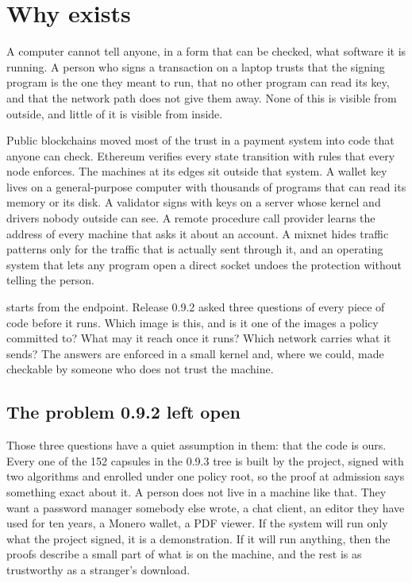 \section{Why \nonos{} exists}\label{sec:why}

A computer cannot tell anyone, in a form that can be checked, what software it is running. A person who signs a transaction on a laptop trusts that the signing program is the one they meant to run, that no other program can read its key, and that the network path does not give them away. None of this is visible from outside, and little of it is visible from inside.

Public blockchains moved most of the trust in a payment system into code that anyone can check. Ethereum verifies every state transition with rules that every node enforces. The machines at its edges sit outside that system. A wallet key lives on a general-purpose computer with thousands of programs that can read its memory or its disk. A validator signs with keys on a server whose kernel and drivers nobody outside can see. A remote procedure call provider learns the address of every machine that asks it about an account. A mixnet hides traffic patterns only for the traffic that is actually sent through it, and an operating system that lets any program open a direct socket undoes the protection without telling the person.

\nonos{} starts from the endpoint. Release 0.9.2 asked three questions of every piece of code before it runs. Which image is this, and is it one of the images a policy committed to? What may it reach once it runs? Which network carries what it sends? The answers are enforced in a small kernel and, where we could, made checkable by someone who does not trust the machine.

\subsection{The problem 0.9.2 left open}

Those three questions have a quiet assumption in them: that the code is ours. Every one of the 152 capsules in the 0.9.3 tree is built by the project, signed with two algorithms and enrolled under one policy root, so the proof at admission says something exact about it. A person does not live in a machine like that. They want a password manager somebody else wrote, a chat client, an editor they have used for ten years, a Monero wallet, a PDF viewer. If the system will run only what the project signed, it is a demonstration. If it will run anything, then the proofs describe a small part of what is on the machine, and the rest is as trustworthy as a stranger's download.

